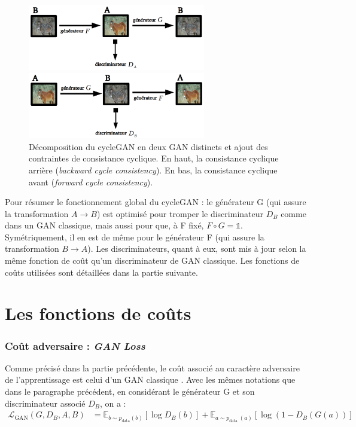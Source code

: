 \begin{figure}[!h]
\centering
\includegraphics[width=220pt]{"images/cycle/cycleBack"}

\vspace{6mm}

\includegraphics[width=220pt]{"images/cycle/cycleFor"}
\caption{Décomposition du cycleGAN en deux GAN distincts et ajout des contraintes de consistance cyclique. En haut, la consistance cyclique arrière (\textit{backward cycle consistency}). En bas, la consistance cyclique avant (\textit{forward cycle consistency}).}
\label{cycleForBack}
\end{figure}

Pour résumer le fonctionnement global du cycleGAN : le générateur G (qui assure la transformation $ A \rightarrow B $) est optimisé pour tromper le discriminateur $ D_B $ comme dans un GAN classique, mais aussi pour que, à F fixé, $ F \circ G = \mathbb{1} $. Symétriquement, il en est de même pour le générateur F (qui assure la transformation $ B \rightarrow A $). Les discriminateurs, quant à eux, sont mis à jour selon la même fonction de coût qu'un discriminateur de GAN classique. Les fonctions de coûts utilisées sont détaillées dans la partie suivante.


\section{Les fonctions de coûts}

\subsubsection{Coût adversaire : \textit{GAN Loss}}

Comme précisé dans la partie précédente, le coût associé au caractère adversaire de l'apprentissage est celui d'un GAN classique \cite{goodfellow_nips_2016}. Avec les mêmes notations que dans le paragraphe précédent, en considérant le générateur G et son discriminateur associé $D_B$, on a :
$$\begin{aligned}
\mathcal{L}_{\mathrm{GAN}}\left(G, D_{B}, A, B\right) &=\mathbb{E}_{b \sim p_{\mathrm{data}}(b)}\left[\log D_{B}(b)\right] +\mathbb{E}_{a \sim p_{\text {data }}(a)}\left[\log \left(1-D_{B}(G(a))\right]\right.
\end{aligned}$$

